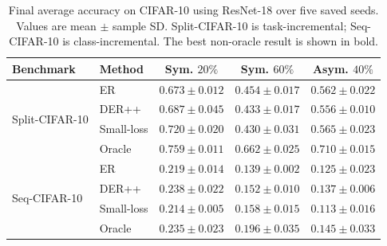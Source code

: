 \begin{table}[!htbp]
\centering
\caption{Final average accuracy on CIFAR-10 using ResNet-18 over five saved seeds. Values are mean $\pm$ sample SD. Split-CIFAR-10 is task-incremental; Seq-CIFAR-10 is class-incremental. The best non-oracle result is shown in bold.}
\label{tab:cifar}
\footnotesize
\setlength{\tabcolsep}{4pt}
\renewcommand{\arraystretch}{0.94}
\begin{tabular}{llccc}
\toprule
Benchmark & Method & Sym. $20\%$ & Sym. $60\%$ & Asym. $40\%$ \\
\midrule
\multirow{4}{*}{Split-CIFAR-10}
& ER & $0.673\pm 0.012$ & $\mathbf{0.454\pm 0.017}$ & $0.562\pm 0.022$ \\
& DER++ & $0.687\pm 0.045$ & $0.433\pm 0.017$ & $0.556\pm 0.010$ \\
& Small-loss & $\mathbf{0.720\pm 0.020}$ & $0.430\pm 0.031$ & $\mathbf{0.565\pm 0.023}$ \\
& Oracle & $0.759\pm 0.011$ & $0.662\pm 0.025$ & $0.710\pm 0.015$ \\
\midrule
\multirow{4}{*}{Seq-CIFAR-10}
& ER & $0.219\pm 0.014$ & $0.139\pm 0.002$ & $0.125\pm 0.023$ \\
& DER++ & $\mathbf{0.238\pm 0.022}$ & $0.152\pm 0.010$ & $\mathbf{0.137\pm 0.006}$ \\
& Small-loss & $0.214\pm 0.005$ & $\mathbf{0.158\pm 0.015}$ & $0.113\pm 0.016$ \\
& Oracle & $0.235\pm 0.023$ & $0.196\pm 0.035$ & $0.145\pm 0.033$ \\
\bottomrule
\end{tabular}
\end{table}
\FloatBarrier
